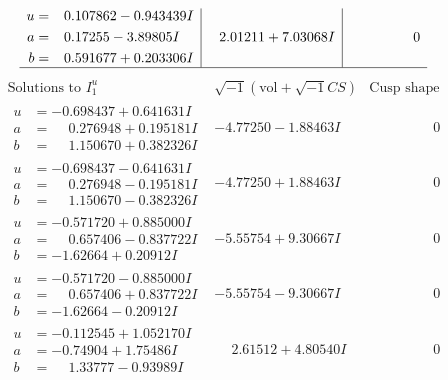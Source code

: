 \documentclass[1p]{elsarticle_modified}
\theoremstyle{definition}
\newcommand{\I}{\sqrt{-1}}
\begin{document}
$$\begin{array}{c|c|c}
\begin{aligned}
u &= \phantom{-}0.107862 - 0.943439 I \\
a &= \phantom{-}0.17255 - 3.89805 I \\
b &= \phantom{-}0.591677 + 0.203306 I\end{aligned}
 & \phantom{-}2.01211 + 7.03068 I & \phantom{-0.000000 } 0\\
 \hline 
 \end{array}$$\newpage$$\begin{array}{c|c|c}  
\text{Solutions to }I^u_{1}& \I (\text{vol} + \sqrt{-1}CS) & \text{Cusp shape}\\
 \hline 
\begin{aligned}
u &= -0.698437 + 0.641631 I \\
a &= \phantom{-}0.276948 + 0.195181 I \\
b &= \phantom{-}1.150670 + 0.382326 I\end{aligned}
 & -4.77250 - 1.88463 I & \phantom{-0.000000 } 0 \\ \hline\begin{aligned}
u &= -0.698437 - 0.641631 I \\
a &= \phantom{-}0.276948 - 0.195181 I \\
b &= \phantom{-}1.150670 - 0.382326 I\end{aligned}
 & -4.77250 + 1.88463 I & \phantom{-0.000000 } 0 \\ \hline\begin{aligned}
u &= -0.571720 + 0.885000 I \\
a &= \phantom{-}0.657406 - 0.837722 I \\
b &= -1.62664 + 0.20912 I\end{aligned}
 & -5.55754 + 9.30667 I & \phantom{-0.000000 } 0 \\ \hline\begin{aligned}
u &= -0.571720 - 0.885000 I \\
a &= \phantom{-}0.657406 + 0.837722 I \\
b &= -1.62664 - 0.20912 I\end{aligned}
 & -5.55754 - 9.30667 I & \phantom{-0.000000 } 0 \\ \hline\begin{aligned}
u &= -0.112545 + 1.052170 I \\
a &= -0.74904 + 1.75486 I \\
b &= \phantom{-}1.33777 - 0.93989 I\end{aligned}
 & \phantom{-}2.61512 + 4.80540 I & \phantom{-0.000000 } 0 \\ \hline\begin{aligned}

\end{aligned}
\end{array}$$
\end{document}
